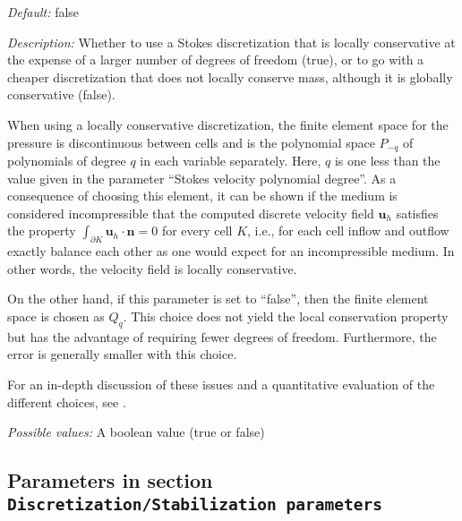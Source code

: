 \begin{itemize}
{\it Default:} false


{\it Description:} Whether to use a Stokes discretization that is locally conservative at the expense of a larger number of degrees of freedom (true), or to go with a cheaper discretization that does not locally conserve mass, although it is globally conservative (false).

When using a locally conservative discretization, the finite element space for the pressure is discontinuous between cells and is the polynomial space $P_ {-q}$ of polynomials of degree $q$ in each variable separately. Here, $q$ is one less than the value given in the parameter ``Stokes velocity polynomial degree''. As a consequence of choosing this element, it can be shown if the medium is considered incompressible that the computed discrete velocity field $\mathbf u_h$ satisfies the property $\int_ {\partial K} \mathbf u_h \cdot \mathbf n = 0$ for every cell $K$, i.e., for each cell inflow and outflow exactly balance each other as one would expect for an incompressible medium. In other words, the velocity field is locally conservative.

On the other hand, if this parameter is set to ``false'', then the finite element space is chosen as $Q_q$. This choice does not yield the local conservation property but has the advantage of requiring fewer degrees of freedom. Furthermore, the error is generally smaller with this choice.

For an in-depth discussion of these issues and a quantitative evaluation of the different choices, see \cite {KHB12} .


{\it Possible values:} A boolean value (true or false)
\end{itemize}



\subsection{Parameters in section \tt Discretization/Stabilization parameters}
\label{parameters:Discretization/Stabilization_20parameters}

